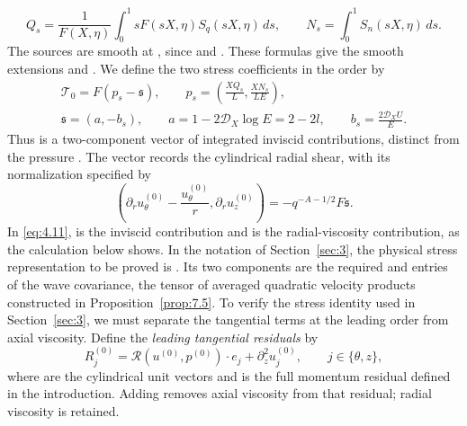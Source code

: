 \[
 Q_s=\frac{1}{F(X,\eta)}\int_0^1 sF(sX,\eta)S_q(sX,\eta)\,ds,
 \qquad
 N_s=\int_0^1 S_n(sX,\eta)\,ds.
\]
The sources are smooth at , since
 and
. These formulas give the smooth
extensions  and
. We define the two
%
stress coefficients in the order  by
\begin{equation}
\begin{gathered}
 \mathcal T_0=F(p_s-\mathfrak{s}),
 \qquad
 p_s=\left(\frac{XQ_s}{L},\frac{XN_s}{LE}\right),\\
 \mathfrak{s}=(a,-b_s),
 \qquad
 a=1-2\mathcal D_X\log E=2-2l,
 \qquad
 b_s=\frac{2\mathcal D_XU}{E}.
\end{gathered}
\tag{4.11}\label{eq:4.11}
\end{equation}
Thus  is a two-component vector of integrated inviscid
contributions, distinct from the pressure . The
vector  records the cylindrical
radial shear, with its normalization specified by
\[
 \left(\partial_ru_\theta^{(0)}-\frac{u_\theta^{(0)}}{r},
       \partial_ru_z^{(0)}\right)
 =-q^{-A-1/2}F\mathfrak{s}.
\]
In \eqref{eq:4.11},  is the inviscid contribution
and  is the radial-viscosity contribution,
as the calculation below shows. In the notation of Section~\ref{sec:3}, the
physical stress representation to be proved is
. Its two components are the
required  and  entries of the wave
covariance, the tensor of averaged quadratic velocity products constructed in
Proposition~\ref{prop:7.5}. To verify the stress identity used in
Section~\ref{sec:3}, we must separate the tangential terms at the leading
order from axial viscosity. Define the \emph{leading tangential residuals} by
\begin{equation}
 R_j^{(0)}=\mathscr R(u^{(0)},p^{(0)})\mathbin{\cdot}e_j
            +\partial_z^2u_j^{(0)},
 \qquad j\in\{\theta,z\},
\tag{4.12}\label{eq:4.12}
\end{equation}
where  are the cylindrical unit vectors and
 is the full momentum residual defined in the
introduction. Adding  removes axial
viscosity from that residual; radial viscosity is retained.

